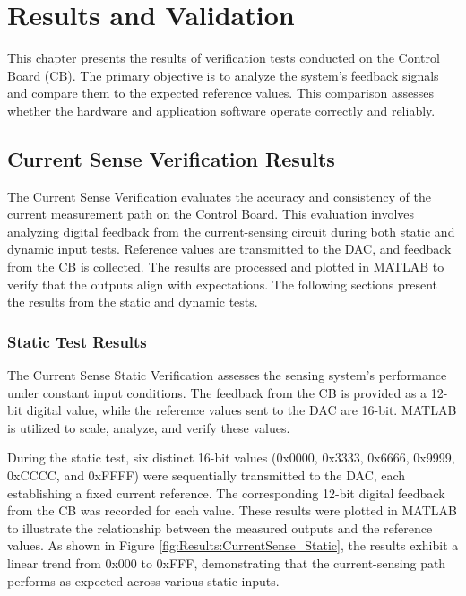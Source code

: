 \chapter{Results and Validation}
\label{ch:Results_and_Validation}

This chapter presents the results of verification tests conducted on the Control Board (CB). The primary objective is to analyze the system’s feedback signals and compare them to the expected reference values. This comparison assesses whether the hardware and application software operate correctly and reliably.

\section{Current Sense Verification Results}
\label{sec:Results_and_Validation:CurrentSenseVerificationResults}

The Current Sense Verification evaluates the accuracy and consistency of the current measurement path on the Control Board. This evaluation involves analyzing digital feedback from the current-sensing circuit during both static and dynamic input tests. Reference values are transmitted to the \acs{DAC}, and feedback from the \acs{CB} is collected. The results are processed and plotted in MATLAB to verify that the outputs align with expectations. The following sections present the results from the static and dynamic tests.

\subsection{Static Test Results}
\label{sec:Results_and_Validation:CurrentSenseVerificationResults_static}

The Current Sense Static Verification assesses the sensing system's performance under constant input conditions. The feedback from the \acs{CB} is provided as a 12-bit digital value, while the reference values sent to the \acs{DAC} are 16-bit. MATLAB is utilized to scale, analyze, and verify these values.

During the static test, six distinct 16-bit values (0x0000, 0x3333, 0x6666, 0x9999, 0xCCCC, and 0xFFFF) were sequentially transmitted to the \acs{DAC}, each establishing a fixed current reference. The corresponding 12-bit digital feedback from the \acs{CB} was recorded for each value. These results were plotted in MATLAB to illustrate the relationship between the measured outputs and the reference values. As shown in Figure \ref{fig:Results:CurrentSense_Static}, the results exhibit a linear trend from 0x000 to 0xFFF, demonstrating that the current-sensing path performs as expected across various static inputs.

